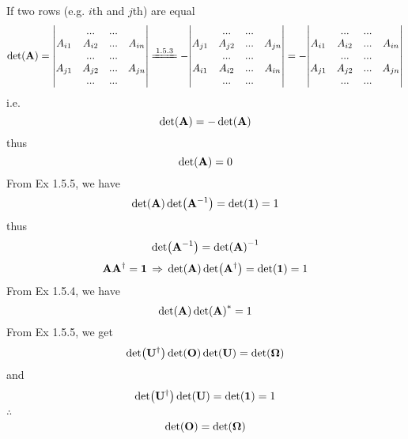 \documentclass[a4paper]{article}
\begin{document}
If two rows (e.g. $ i $th and $ j $th) are equal
\begin{equation}\label{key}
\det(\vb{A}) = \mqty|  & ... & ... & \\
      A_{i1} & A_{i2} & ... & A_{in}\\
        & ... & ... & \\
      A_{j1} & A_{j2} & ... & A_{jn}\\
        & ... & ... & \\|
\xlongequal{1.5.3} -\mqty|  & ... & ... & \\
A_{j1} & A_{j2} & ... & A_{jn}\\
& ... & ... & \\
A_{i1} & A_{i2} & ... & A_{in}\\
& ... & ... & \\|
= - \mqty|  & ... & ... & \\
A_{i1} & A_{i2} & ... & A_{in}\\
& ... & ... & \\
A_{j1} & A_{j2} & ... & A_{jn}\\
& ... & ... & \\|
\end{equation}
i.e.
\begin{equation}\label{key}
\det(\vb{A}) = -\det(\vb{A})
\end{equation}
thus
\begin{equation}\label{key}
\det(\vb{A}) = 0
\end{equation}
From Ex 1.5.5, we have
\begin{equation}\label{key}
\det(\vb{A})\det(\vb{A}^{-1}) = \det({\large \bm{1}}) = 1
\end{equation}
thus
\begin{equation}\label{key}
\det(\vb{A}^{-1}) = \det(\vb{A})^{-1}
\end{equation}
\begin{equation}\label{key}
\vb{A}\vb{A}^\dagger = {\large \bm{1}} \;\operatorname{\Rightarrow}\; \det(\vb{A})\det(\vb{A}^\dagger) = \det({\large \bm{1}}) = 1
\end{equation}
From Ex 1.5.4, we have
\begin{equation}\label{key}
\det(\vb{A})\det(\vb{A})^* = 1
\end{equation}
From Ex 1.5.5, we get
\begin{equation}\label{key}
\det(\vb{U}^\dagger)\det(\vb{O})\det(\vb{U}) = \det(\bm\Omega)
\end{equation}
and
\begin{equation}\label{key}
\det(\vb{U}^\dagger)\det(\vb{U}) = \det({\large \bm{1}}) = 1
\end{equation}
$ \therefore $
\begin{equation}\label{key}
\det(\vb{O}) = \det(\bm\Omega)
\end{equation}
\end{document}
